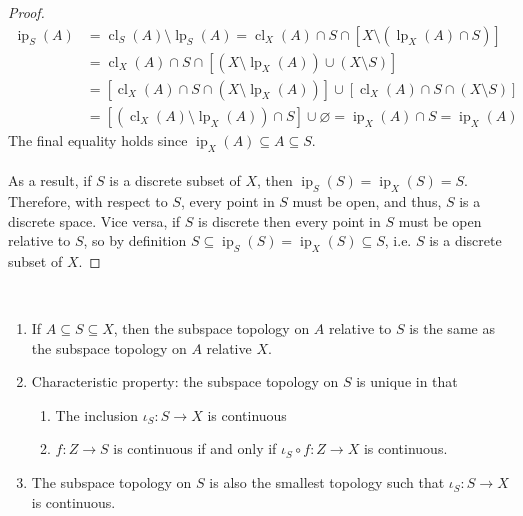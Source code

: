 \documentclass{treatise}
\begin{document}
\begin{proof}
\begin{align*}
    \operatorname{ip}_S (A) & = \operatorname{cl}_S (A) \setminus \operatorname{lp}_S (A) = \operatorname{cl}_X (A) \cap S \cap [X \setminus (\operatorname{lp}_X (A) \cap S)]
    \\
    & = \operatorname{cl}_X (A) \cap S \cap [(X \setminus \operatorname{lp}_X (A)) \cup (X \setminus S)]
    \\
    & = [\operatorname{cl}_X (A) \cap S \cap (X \setminus \operatorname{lp}_X (A))] \cup [ \operatorname{cl}_X (A) \cap S \cap (X \setminus S)]
    \\
    & = [(\operatorname{cl}_X (A) \setminus \operatorname{lp}_X (A)) \cap S] \cup \varnothing = \operatorname{ip}_X (A) \cap S = \operatorname{ip}_X (A)
\end{align*}
The final equality holds since $\operatorname{ip}_X (A) \subseteq A \subseteq S$.
\\
\\
As a result, if $S$ is a discrete subset of $X$, then $\operatorname{ip}_S (S) = \operatorname{ip}_X (S) = S$. Therefore, with respect to $S$, every point in $S$ must be open, and thus, $S$ is a discrete space. Vice versa, if $S$ is discrete then every point in $S$ must be open relative to $S$, so by definition $S \subseteq \operatorname{ip}_S (S) = \operatorname{ip}_X (S) \subseteq S$, i.e. $S$ is a discrete subset of $X$.
\end{proof}
\begin{proposition} \ 
\begin{enumerate}
    \item If $A \subseteq S \subseteq X$, then the subspace topology on $A$ relative to $S$ is the same as the subspace topology on $A$ relative $X$.
    \item Characteristic property: the subspace topology on $S$ is unique in that
    \begin{enumerate}
        \item The inclusion $\iota_S: S \to X$ is continuous
        \item $f: Z \to S$ is continuous if and only if $\iota_S \circ f: Z \to X$ is continuous.
    \end{enumerate}
    \item The subspace topology on $S$ is also the smallest topology such that $\iota_S: S \to X$ is continuous.
\end{enumerate}
\end{proposition}
\end{document}
